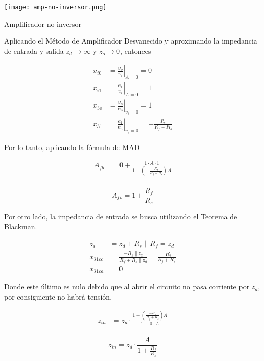 \begin{ilustracion}[ht]
    \centering
    \texttt{[image: amp-no-inversor.png]}
    \caption{Amplificador no inversor}
    \label{ilus:mt-amp-no-inversor}
\end{ilustracion}

Aplicando el Método de Amplificador Desvanecido y aproximando la impedancia de entrada y salida $z_d \rightarrow \infty$ y $z_o \rightarrow 0$, entonces

\begin{align*}
x_{i0} &= \left. \frac{v_o}{v_i} \right|_{A=0} = 0 \\
x_{i1} &= \left. \frac{e_1}{v_i} \right|_{A=0} = 1 \\
x_{3o} &= \left. \frac{v_o}{e_3} \right|_{v_i=0} = 1 \\
x_{31} &= \left. \frac{e_1}{e_3} \right|_{v_i=0} = -\frac{R_s}{R_f + R_s}
\end{align*}


Por lo tanto, aplicando la fórmula de MAD

\begin{align*}
A_{fb} &= 0 + \frac{1 \cdot A \cdot 1}{1 - \left( -\frac{R_s}{R_f + R_s} \right) A} \\
\end{align*}

\begin{equation}
    \boxed{A_{fb} = 1 + \frac{R_f}{R_s}}
    \label{eq:mt-ganancia-amp-no-inversor}
\end{equation}

Por otro lado, la impedancia de entrada se busca utilizando el Teorema de Blackman.

\begin{align*}
z_a &= z_d + R_s \parallel R_f = z_d \\
x_{31cc} &= \frac{-R_s \parallel z_d}{R_f + R_s \parallel z_d} = \frac{-R_s}{R_f + R_s} \\
x_{31ca} &= 0
\end{align*}

Donde este último es nulo debido que al abrir el circuito no pasa corriente por $z_d$, por consiguiente no habrá tensión.

\begin{align*}
z_{in} &= z_d \cdot \frac{1 - \left( \frac{-R_s}{R_f + R_s} \right) A}{1 - 0 \cdot A} \\
\end{align*}

\begin{equation}
    \boxed{z_{in} = z_d \cdot \frac{ A}{1 + \frac{R_f}{R_s}}}
\end{equation}


